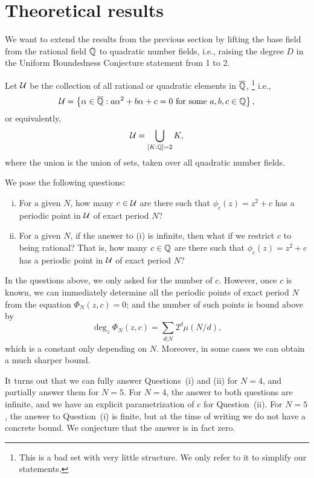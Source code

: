 \section{Theoretical results}

We want to extend the results from the previous section by lifting the
base field from the rational field $\mathbb{Q}$ to quadratic number fields,
i.e., raising the degree $D$ in the Uniform Boundedness Conjecture
statement from 1 to 2.

Let $\mathcal{U}$ be the collection of all rational or quadratic elements in
$\overline{\mathbb{Q}}$,%
\footnote{This is a bad set with very little structure. We only refer
  to it to simplify our statements.}  i.e.,
\[
\mathcal{U} = \left\{\alpha \in \overline{\mathbb{Q}}: \text{$a \alpha^2 + b \alpha + c = 0$
    for some $a, b, c \in \mathbb{Q}$}\right\},
\]
or equivalently,
\[
\mathcal{U} = \bigcup_{[K : \mathbb{Q}] = 2}K,
\]
where the union is the union of sets, taken over all quadratic number
fields.

We pose the following questions:
\begin{enumerate}[(i)]
\item For a given $N$, how many $c \in \mathcal{U}$ are there such that
  $\phi_c(z) = z^2 + c$ has a periodic point in $\mathcal{U}$ of exact period
  $N$?

\item For a given $N$, if the answer to (i) is infinite, then what if
  we restrict $c$ to being rational? That is, how many $c \in \mathbb{Q}$ are
  there such that $\phi_c(z) = z^2 + c$ has a periodic point in $\mathcal{U}$
  of exact period $N$?
\end{enumerate}

\begin{remark}
  In the questions above, we only asked for the number of
  $c$. However, once $c$ is known, we can immediately determine all
  the periodic points of exact period $N$ from the equation $\Phi_N(z,
  c) = 0$; and the number of such points is bound above by
  \[
  \deg_z \Phi_N(z, c) = \sum_{d|N}2^d \mu(N/d),
  \]
  which is a constant only depending on $N$. Moreover,
  in some cases we can obtain a much sharper bound.
\end{remark}

It turns out that we can fully answer Questions~(i) and (ii) for $N =
4$, and partially answer them for $N = 5$. For $N = 4$, the answer to
both questions are infinite, and we have an explicit parametrization
of $c$ for Question~(ii). For $N = 5$, the answer to Question~(i) is
finite, but at the time of writing we do not have a concrete bound. We
conjecture that the answer is in fact zero.

